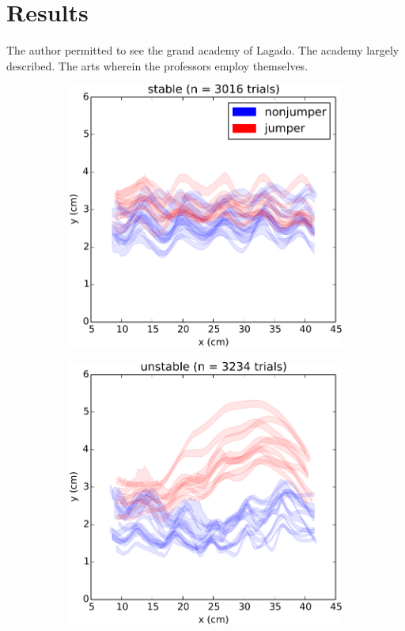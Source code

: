 \section{Results}

The author permitted to see the grand academy of Lagado.  The academy largely described.  The arts wherein the professors employ themselves.

\begin{figure}
\begin{subfigure}{.5\linewidth}
\centering\includegraphics[width=\columnwidth]{chapters/figuresChBehaviour/noseTrajectoryStable}
\label{fig:noseTrajectoryStable}
\end{subfigure}%
\begin{subfigure}{.5\linewidth}
\centering\includegraphics[width=\columnwidth]{chapters/figuresChBehaviour/noseTrajectoryUnstable}

\end{subfigure}
\end{figure}
